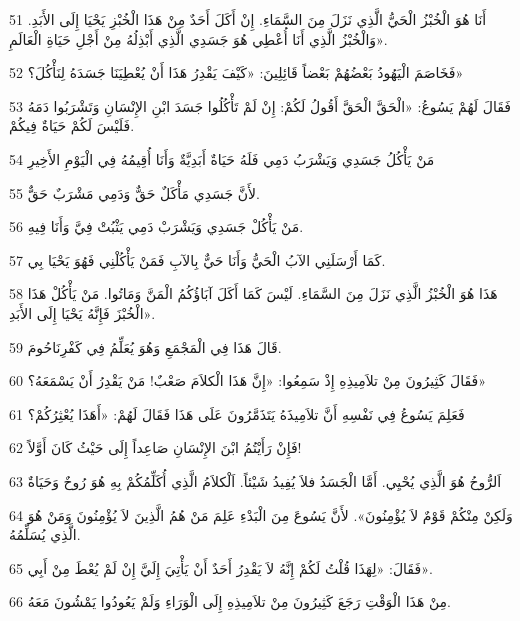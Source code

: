 \par 51 أَنَا هُوَ الْخُبْزُ الْحَيُّ الَّذِي نَزَلَ مِنَ السَّمَاءِ. إِنْ أَكَلَ أَحَدٌ مِنْ هَذَا الْخُبْزِ يَحْيَا إِلَى الأَبَدِ. وَالْخُبْزُ الَّذِي أَنَا أُعْطِي هُوَ جَسَدِي الَّذِي أَبْذِلُهُ مِنْ أَجْلِ حَيَاةِ الْعَالَمِ».
\par 52 فَخَاصَمَ الْيَهُودُ بَعْضُهُمْ بَعْضاً قَائِلِينَ: «كَيْفَ يَقْدِرُ هَذَا أَنْ يُعْطِيَنَا جَسَدَهُ لِنَأْكُلَ؟»
\par 53 فَقَالَ لَهُمْ يَسُوعُ: «الْحَقَّ الْحَقَّ أَقُولُ لَكُمْ: إِنْ لَمْ تَأْكُلُوا جَسَدَ ابْنِ الإِنْسَانِ وَتَشْرَبُوا دَمَهُ فَلَيْسَ لَكُمْ حَيَاةٌ فِيكُمْ.
\par 54 مَنْ يَأْكُلُ جَسَدِي وَيَشْرَبُ دَمِي فَلَهُ حَيَاةٌ أَبَدِيَّةٌ وَأَنَا أُقِيمُهُ فِي الْيَوْمِ الأَخِيرِ
\par 55 لأَنَّ جَسَدِي مَأْكَلٌ حَقٌّ وَدَمِي مَشْرَبٌ حَقٌّ.
\par 56 مَنْ يَأْكُلْ جَسَدِي وَيَشْرَبْ دَمِي يَثْبُتْ فِيَّ وَأَنَا فِيهِ.
\par 57 كَمَا أَرْسَلَنِي الآبُ الْحَيُّ وَأَنَا حَيٌّ بِالآبِ فَمَنْ يَأْكُلْنِي فَهُوَ يَحْيَا بِي.
\par 58 هَذَا هُوَ الْخُبْزُ الَّذِي نَزَلَ مِنَ السَّمَاءِ. لَيْسَ كَمَا أَكَلَ آبَاؤُكُمُ الْمَنَّ وَمَاتُوا. مَنْ يَأْكُلْ هَذَا الْخُبْزَ فَإِنَّهُ يَحْيَا إِلَى الأَبَدِ».
\par 59 قَالَ هَذَا فِي الْمَجْمَعِ وَهُوَ يُعَلِّمُ فِي كَفْرِنَاحُومَ.
\par 60 فَقَالَ كَثِيرُونَ مِنْ تلاَمِيذِهِ إِذْ سَمِعُوا: «إِنَّ هَذَا الْكلاَمَ صَعْبٌ! مَنْ يَقْدِرُ أَنْ يَسْمَعَهُ؟»
\par 61 فَعَلِمَ يَسُوعُ فِي نَفْسِهِ أَنَّ تلاَمِيذَهُ يَتَذَمَّرُونَ عَلَى هَذَا فَقَالَ لَهُمْ: «أَهَذَا يُعْثِرُكُمْ؟
\par 62 فَإِنْ رَأَيْتُمُ ابْنَ الإِنْسَانِ صَاعِداً إِلَى حَيْثُ كَانَ أَوَّلاً!
\par 63 اَلرُّوحُ هُوَ الَّذِي يُحْيِي. أَمَّا الْجَسَدُ فلاَ يُفِيدُ شَيْئاً. اَلْكلاَمُ الَّذِي أُكَلِّمُكُمْ بِهِ هُوَ رُوحٌ وَحَيَاةٌ
\par 64 وَلَكِنْ مِنْكُمْ قَوْمٌ لاَ يُؤْمِنُونَ». لأَنَّ يَسُوعَ مِنَ الْبَدْءِ عَلِمَ مَنْ هُمُ الَّذِينَ لاَ يُؤْمِنُونَ وَمَنْ هُوَ الَّذِي يُسَلِّمُهُ.
\par 65 فَقَالَ: «لِهَذَا قُلْتُ لَكُمْ إِنَّهُ لاَ يَقْدِرُ أَحَدٌ أَنْ يَأْتِيَ إِلَيَّ إِنْ لَمْ يُعْطَ مِنْ أَبِي».
\par 66 مِنْ هَذَا الْوَقْتِ رَجَعَ كَثِيرُونَ مِنْ تلاَمِيذِهِ إِلَى الْوَرَاءِ وَلَمْ يَعُودُوا يَمْشُونَ مَعَهُ.
